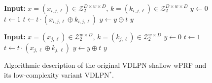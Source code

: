 \documentclass[journal=tosc,submission]{iacrtrans}
\theoremstyle{theorem}
\newcommand\Z{\mathcal{Z}}
\begin{document}
\begin{figure}[ht]
\centering
\begin{minipage}[t]{0.47\textwidth}
\begin{algorithm}[H]
  \caption{\label{alg:vdlpn}The {\sf VDLPN} wPRF\\Parameters: Integers $w, D$}
  \begin{algorithmic}
   \State \textbf{Input:} $x = (x_{i,j,\ell}) \in \Z_2^{D \times w \times D}$, $k = (k_{i,j,\ell}) \in \Z_2^{D \times w \times D}$
    \State $y \gets 0$
        \State $t \gets 1$
          \State $t \gets t \cdot (x_{i,j,\ell} \oplus k_{i,j,\ell})$
        \EndFor
        \State $y \gets y \oplus t$
      \EndFor
    \EndFor
    \State \Return $y$
  \end{algorithmic}
\end{algorithm}
\end{minipage}
\hfill
\begin{minipage}[t]{0.47\textwidth}
\begin{algorithm}[H]
  \caption{\label{alg:vdlpn_simple}The {\sf VDLPN}$^*$ wPRF\\Parameters: Integers $w, D$}
  \begin{algorithmic}
    \State \textbf{Input:} $x = (x_{j,\ell}) \in \Z_2^{w\times D}$,  $k = (k_{j,\ell}) \in \Z_2^{w\times D}$
    \State $y \gets 0$
        \State $t \gets 1$
          \State $t \gets t \cdot (x_{j,\ell} \oplus k_{j,\ell})$
        \EndFor
        \State $y \gets y \oplus t$
      \EndFor
    \EndFor
    \State \Return $y$
  \end{algorithmic}
\end{algorithm}
\end{minipage}
\caption{Algorithmic description of the original {\sf VDLPN} shallow wPRF and its low-complexity variant {\sf VDLPN}$^*$.}
\end{figure}
\end{document}

